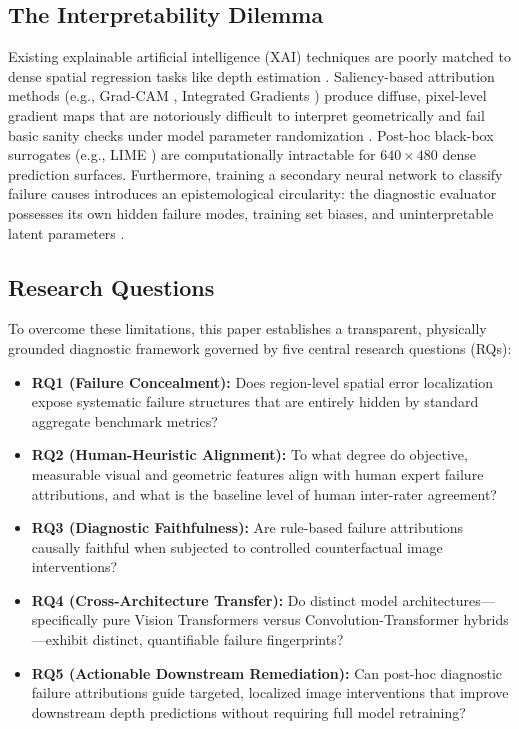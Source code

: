 \documentclass[11pt,a4paper]{article}
\begin{document}
\subsection{The Interpretability Dilemma}
Existing explainable artificial intelligence (XAI) techniques are poorly matched to dense spatial regression tasks like depth estimation \citep{cheng2025comprehensive}. Saliency-based attribution methods (e.g., Grad-CAM \citep{selvaraju2020grad}, Integrated Gradients \citep{sundararajan2017axiomatic}) produce diffuse, pixel-level gradient maps that are notoriously difficult to interpret geometrically and fail basic sanity checks under model parameter randomization \citep{adebayo2018sanity}. Post-hoc black-box surrogates (e.g., LIME \citep{ribeiro2016why}) are computationally intractable for $640 \times 480$ dense prediction surfaces. Furthermore, training a secondary neural network to classify failure causes introduces an epistemological circularity: the diagnostic evaluator possesses its own hidden failure modes, training set biases, and uninterpretable latent parameters \citep{gilpin2018explaining}.

\subsection{Research Questions}
To overcome these limitations, this paper establishes a transparent, physically grounded diagnostic framework governed by five central research questions (RQs):
\begin{itemize}
    \item \textbf{RQ1 (Failure Concealment):} Does region-level spatial error localization expose systematic failure structures that are entirely hidden by standard aggregate benchmark metrics?
    \item \textbf{RQ2 (Human-Heuristic Alignment):} To what degree do objective, measurable visual and geometric features align with human expert failure attributions, and what is the baseline level of human inter-rater agreement?
    \item \textbf{RQ3 (Diagnostic Faithfulness):} Are rule-based failure attributions causally faithful when subjected to controlled counterfactual image interventions?
    \item \textbf{RQ4 (Cross-Architecture Transfer):} Do distinct model architectures—specifically pure Vision Transformers versus Convolution-Transformer hybrids—exhibit distinct, quantifiable failure fingerprints?
    \item \textbf{RQ5 (Actionable Downstream Remediation):} Can post-hoc diagnostic failure attributions guide targeted, localized image interventions that improve downstream depth predictions without requiring full model retraining?
\end{itemize}
\end{document}
